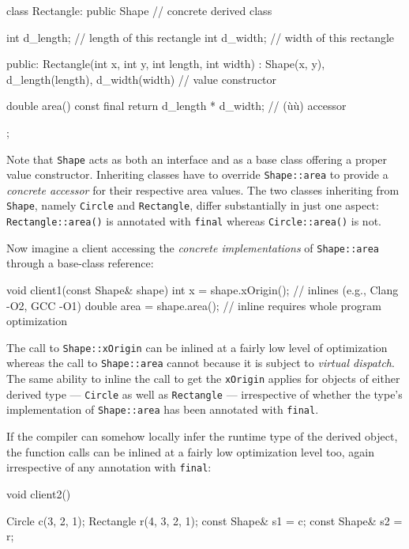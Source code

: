 {{\begin{emcppslisting}[emcppsbatch=e4]
class Rectangle: public Shape   // concrete derived class
{
    int d_length;  // length of this rectangle
    int d_width;   // width of this rectangle

public:
    Rectangle(int x, int y, int length, int width) :
                       Shape(x, y), d_length(length), d_width(width) { }
                                                // value constructor

    double area() const final { return d_length * d_width; }
                                                // (ù{}ù) accessor
};
\end{emcppslisting}
    

\noindent Note that \lstinline!Shape! acts as both an interface and as a base class
offering a proper value constructor. Inheriting classes have to override
\lstinline!Shape::area! to provide a \emph{concrete accessor} for their
respective area values. The two classes inheriting from \lstinline!Shape!,
namely \lstinline!Circle! and \lstinline!Rectangle!, differ substantially in
just one aspect: \lstinline!Rectangle::area()! is annotated with
\lstinline!final! whereas \lstinline!Circle::area()! is not.

Now imagine a client accessing the \emph{concrete implementations} of
\lstinline!Shape::area! through a base-class reference:

\begin{emcppslisting}[emcppsbatch=e4]
void client1(const Shape& shape)
{
    int x = shape.xOrigin();     // inlines (e.g., Clang -O2, GCC -O1)
    double area = shape.area();  // inline requires whole program optimization
}
\end{emcppslisting}
    

\noindent The call to \lstinline!Shape::xOrigin! can be inlined at a fairly low level
of optimization whereas the call to \lstinline!Shape::area! cannot because
it is subject to \emph{virtual dispatch}. The same ability to inline the
call to get the \lstinline!xOrigin! applies for objects of either derived
type --- \lstinline!Circle! as well as \lstinline!Rectangle! --- irrespective
of whether the type's implementation of \lstinline!Shape::area! has been
annotated with \lstinline!final!.

If the compiler can somehow locally infer the runtime type of the
derived object, the function calls can be inlined at a fairly low
optimization level too, again irrespective of any annotation with
\lstinline!final!:

\begin{emcppslisting}[emcppsbatch=e4]
void client2()
{
    Circle c(3, 2, 1);
    Rectangle r(4, 3, 2, 1);
    const Shape& s1 = c;
    const Shape& s2 = r;

}
\end{emcppslisting}}}
